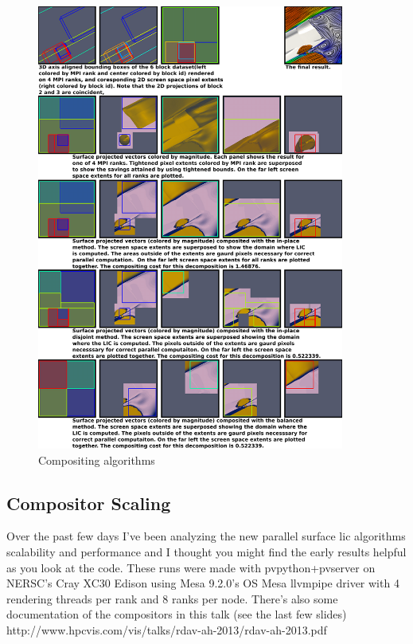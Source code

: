\documentclass[a4paper,10pt]{article}
\begin{document}
\begin{figure}[ht]
 \centering
 \includegraphics[width=0.9\textwidth]{./images-data/compositing-200ppi.png}
 \caption{Compositing algorithms}
 \label{fig:compositing}
\end{figure}

\FloatBarrier






\subsection{Compositor Scaling}
Over the past few days I've been analyzing the new parallel surface lic algorithms scalability and performance and I thought you might find the early results helpful as you look at the code. These runs were made with pvpython+pvserver on NERSC's Cray XC30 Edison using Mesa 9.2.0's OS Mesa llvmpipe driver with 4 rendering threads per rank and 8 ranks per node. There's also some documentation of the compositors in this talk (see the last few slides) http://www.hpcvis.com/vis/talks/rdav-ah-2013/rdav-ah-2013.pdf
\end{document}
